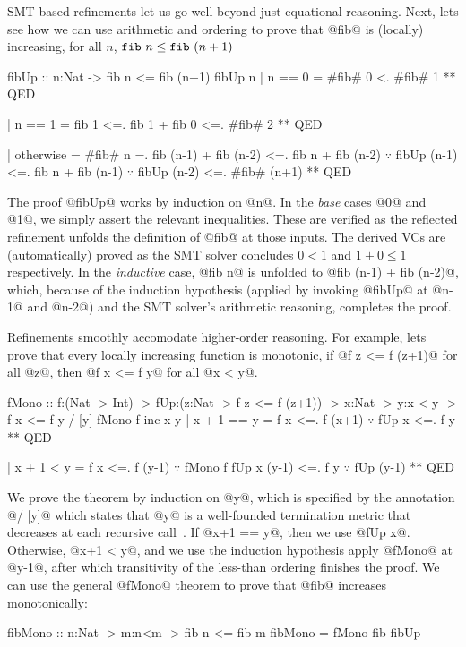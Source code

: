 %
SMT based refinements let us go well beyond just equational
reasoning. Next, lets see how we can use arithmetic and
ordering to prove that @fib@ is (locally) increasing,
%
\ie for all $n$, $\texttt{fib}\ {n} \leq \texttt{fib}\ {(n+1)}$
%
\begin{mcode}
  fibUp :: n:Nat -> { fib n <= fib (n+1) }
  fibUp n
    | n == 0
    =  #fib# 0 <. #fib# 1
    ** QED

    | n == 1
    =  fib 1 <=. fib 1 + fib 0 <=. #fib# 2
    ** QED

    | otherwise
    =  #fib# n
    =. fib (n-1) + fib (n-2)
    <=. fib n     + fib (n-2) $\because$ fibUp (n-1)
    <=. fib n     + fib (n-1) $\because$ fibUp (n-2)
    <=. #fib# (n+1)
    ** QED
\end{mcode} %

%
The proof @fibUp@ works by induction on @n@.
%
In the \emph{base} cases @0@ and @1@, we simply assert
the relevant inequalities. These are verified as the
reflected refinement unfolds the definition of
@fib@ at those inputs.
%
The derived VCs are (automatically) proved
as the SMT solver concludes $0 < 1$ and $1 + 0 \leq 1$
respectively.
%
In the \emph{inductive} case, @fib n@ is unfolded
to  @fib (n-1) + fib (n-2)@, which, because of the
induction hypothesis (applied by invoking @fibUp@
at @n-1@ and @n-2@) and the SMT solver's arithmetic
reasoning, completes the proof.

%
Refinements smoothly accomodate higher-order reasoning.
%
For example, lets prove that every locally increasing
function is monotonic, \ie
if @f z <= f (z+1)@ for all @z@,
then @f x <= f y@ for all @x < y@.
%
\begin{mcode}
  fMono :: f:(Nat -> Int)
        -> fUp:(z:Nat -> {f z <= f (z+1)})
        -> x:Nat
        -> y:{x < y}
        -> {f x <= f y} / [y]
  fMono f inc x y
    | x + 1 == y
    =  f x <=. f (x+1) $\because$ fUp x
           <=. f y
           ** QED

    | x + 1 < y
    =  f x <=. f (y-1) $\because$ fMono f fUp x (y-1)
           <=. f y     $\because$ fUp (y-1)
           ** QED
\end{mcode}
%
We prove the theorem by induction
on @y@, which is specified by the
annotation @/ [y]@ which states
that @y@ is a well-founded
termination metric that decreases
at each recursive call~\citep{Vazou14}.
%
%
If @x+1 == y@, then we use @fUp x@.
%
Otherwise, @x+1 < y@, and we use
the induction hypothesis \ie apply
@fMono@ at @y-1@, after which
transitivity of the less-than
ordering finishes the proof.
%
We can use the general @fMono@
theorem to prove that @fib@
increases monotonically:
%
\begin{code}
  fibMono :: n:Nat -> m:{n<m} ->
             {fib n <= fib m}
  fibMono = fMono fib fibUp
\end{code}


